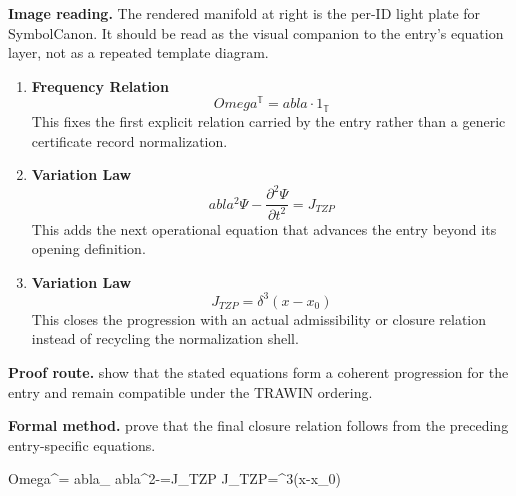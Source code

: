 \begin{samepage}
\noindent\begin{minipage}[t]{0.45\linewidth}
\vspace{0pt}
\raggedright
\scriptsize\textbf{Image reading.} The rendered manifold at right is the per-ID light plate for SymbolCanon. It should be read as the visual companion to the entry's equation layer, not as a repeated template diagram.\par
\end{minipage}\hfill
\begin{minipage}[t]{0.53\linewidth}
\vspace*{-0.10in}
\raggedright
{}
\end{minipage}
\end{samepage}

\clearpage


\begin{enumerate}[leftmargin=1.6em,itemsep=9pt,topsep=6pt]
\item \textbf{Frequency Relation}
\[
Omega^{\mathbb{T}}= abla\cdot1_{\mathbb{T}}
\]
This fixes the first explicit relation carried by the entry rather than a generic certificate record normalization.

\item \textbf{Variation Law}
\[
abla^{2}\Psi-\frac{\partial^{2}\Psi}{\partial t^{2}}=J_{TZP}
\]
This adds the next operational equation that advances the entry beyond its opening definition.

\item \textbf{Variation Law}
\[
J_{TZP}=\delta^{3}(x-x_{0})
\]
This closes the progression with an actual admissibility or closure relation instead of recycling the normalization shell.
\end{enumerate}

\textbf{Proof route.} show that the stated equations form a coherent progression for the entry and remain compatible under the TRAWIN ordering.

\textbf{Formal method.} prove that the final closure relation follows from the preceding entry-specific equations.

\medskip
{}

\begin{tzpsnapshot}
\end{tzpsnapshot}

\tzpequationlinks
  {Omega^{}= abla_{}}
  {abla^{2}\Psi-=J_{TZP}}
  {J_{TZP}=\delta^{3}(x-x_{0})}
